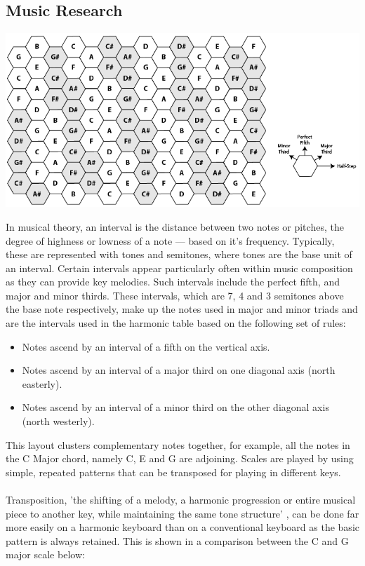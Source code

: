 \documentclass[10pt,a4paper]{article}
\begin{document}
\subsection{Music Research}
\begin{center}
\includegraphics[scale=0.5]{5.png}
\end{center}
In musical theory, an interval is the distance between two notes or pitches, the degree of highness or lowness of a note --- based on it's frequency. Typically, these are represented with tones and semitones, where tones are the base unit of an interval. Certain intervals appear particularly often within music composition as they can provide key melodies. Such intervals include the perfect fifth, and major and minor thirds. These intervals, which are 7, 4 and 3 semitones above the base note respectively, make up the notes used in major and minor triads and are the intervals used in the harmonic table based on the following set of rules:\\
\begin{itemize}
\item Notes ascend by an interval of a fifth on the vertical axis.
\item Notes ascend by an interval of a major third on one diagonal axis (north easterly).
\item Notes ascend by an interval of a minor third on the other diagonal axis (north westerly).
\end{itemize}
This layout clusters complementary notes together, for example, all the notes in the C Major chord, namely C, E and G are adjoining. Scales are played by using simple, repeated patterns that can be transposed for playing in different keys. \\
\\
Transposition, 'the shifting of a melody, a harmonic progression or entire musical piece to another key, while maintaining the same tone structure' \cite{koch}, can be done far more easily on a harmonic keyboard than on a conventional keyboard as the basic pattern is always retained. This is shown in a comparison between the C and G major scale below:
\end{document}
